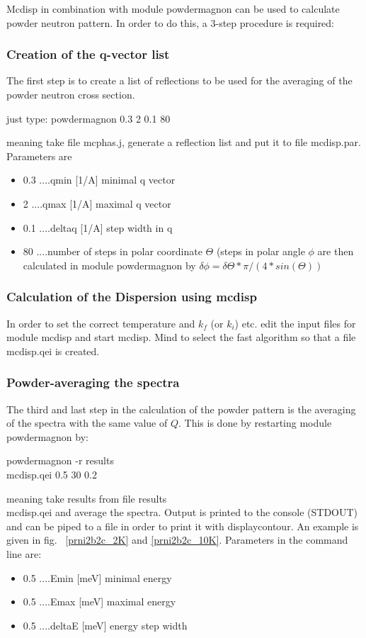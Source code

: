 {\prg Mcdisp} in combination with module {\prg powdermagnon} can be used to calculate
powder neutron pattern. In order to do this, a 3-step procedure is required:

\subsubsection{Creation of the q-vector list}
The first step is to create a list of reflections to be used for 
the averaging of the powder neutron cross section. 

just type: powdermagnon 0.3 2 0.1 80

meaning take file {\prg mcphas.j}, generate a reflection list and put it to 
file {\prg mcdisp.par}. Parameters are 
\begin{itemize}
\item
 0.3 ....qmin   [1/A] minimal q vector
\item
 2   ....qmax   [1/A] maximal q vector
\item
 0.1 ....deltaq [1/A] step width in q
\item
 80  ....number of steps in polar coordinate $\Theta$
        (steps in polar angle $\phi$ are  then calculated in module
        {\prg powdermagnon} by $\delta \phi= \delta \Theta*\pi/(4*sin(\Theta))$
\end{itemize}

\subsubsection{Calculation of the Dispersion using {\prg mcdisp}}

In order to set the correct temperature and $k_f$ (or $k_i$) etc. edit
the input files for module {\prg mcdisp} and start {\prg mcdisp}. Mind 
to select the fast algorithm so that a file {\prg mcdisp.qei} is created.

\subsubsection{Powder-averaging the spectra}
The third and last step in the calculation of the powder pattern is the averaging
of the spectra with the same value of $Q$. This is done by restarting module
{\prg powdermagnon} by: 

powdermagnon -r results\\mcdisp.qei 0.5 30 0.2 

meaning take  results from file {\prg results\\mcdisp.qei} and average the
spectra. Output is printed to the console (STDOUT) and can be piped to a file in
order to print it with {\prg displaycontour}. An example is given in fig.~
\ref{prni2b2c_2K} and \ref{prni2b2c_10K}.
Parameters in the command line are:
\begin{itemize}
\item 0.5 ....Emin   [meV] minimal energy
\item 0.5 ....Emax   [meV] maximal energy
\item 0.5 ....deltaE [meV] energy step width
\end{itemize}
